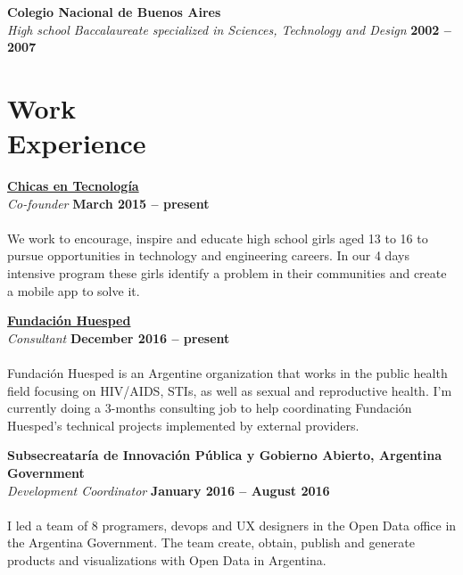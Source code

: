 \documentclass[margin,line]{resume}
\begin{document}
\begin{resume}
\textbf{Colegio Nacional de Buenos Aires} \vspace{2mm}\\\vspace{1mm}
\textsl{High school Baccalaureate specialized in Sciences, Technology and Design} \hfill \textbf{ 2002 -- 2007}\vspace{-3mm}\\\vspace{-1mm}

\section{\mysidestyle Work\\Experience}


\textbf{\href{http://www.chicasentecnologia.org/}{Chicas en Tecnolog\'ia}}\\\vspace{1mm}
\textsl{Co-founder} \hfill \textbf{March 2015 -- present}\vspace{-3mm}\\\vspace{-1mm}
\\
We work to encourage, inspire and educate high school girls aged 13 to 16 to pursue opportunities in technology and engineering careers.  In our 4 days intensive program these girls identify a problem in their communities and create a mobile app to solve it.

\textbf{\href{https://www.huesped.org.ar/}{Fundaci\'on Huesped}}\\\vspace{1mm}
\textsl{Consultant} \hfill \textbf{December 2016 -- present}\vspace{-3mm}\\\vspace{-1mm}
\\
Fundaci\'on Huesped is an Argentine organization that works in the public health field focusing on HIV/AIDS, STIs, as well as sexual and reproductive health.
I'm currently doing a 3-months consulting job to help coordinating Fundaci\'on Huesped's technical projects implemented by external providers.

\textbf{Subsecreatar\'ia de Innovaci\'on P\'ublica y Gobierno Abierto, Argentina Government}\vspace{2mm}\\\vspace{1mm}
\textsl{Development Coordinator} \hfill \textbf{January 2016 -- August 2016}\vspace{-3mm}\\\vspace{-1mm}
\\
I led a team of 8 programers, devops and UX designers in the Open Data office in the Argentina Government. The team create, obtain, publish and generate products and visualizations with Open Data in Argentina.


\end{resume}
\end{document}
